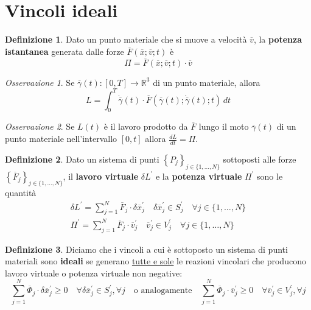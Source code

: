 \documentclass{book}
\theoremstyle{plain}
\theoremstyle{plain}
\theoremstyle{plain}
\theoremstyle{plain}
\theoremstyle{plain}
\theoremstyle{definition}
\newtheorem{defi}{Definizione}[chapter]
\theoremstyle{remark}
\newtheorem*{oss}{Osservazione}
\theoremstyle{definition}
\begin{document}
\section{Vincoli ideali}

\begin{defi}
    Dato un punto materiale che si muove a  velocità $\overline{v}$, la \textbf{potenza istantanea} generata dalle forze $\overline{F}\left(\overline{x}; \overline{v}; t\right)$ è
    \begin{displaymath}
    \boxed{
        \Pi=\overline{F}\left(\overline{x}; \overline{v}; t\right) \cdot \overline{v}
        }
    \end{displaymath}
\end{defi}

\begin{oss}
    Se $\overline{\gamma}(t): [0, T] \to \mathbb{R}^{3}$ di un punto materiale, allora
    \begin{displaymath}
        L=\int_0^{T} \dot{\overline{\gamma}}(t) \cdot \overline{F}\left(\overline{\gamma}(t); \dot{\overline{\gamma}}(t); t\right)\,dt
    \end{displaymath}
\end{oss}

\begin{oss}
    Se $L(t)$ è il lavoro prodotto da $\overline{F}$ lungo il moto $\overline{\gamma}(t)$ di un punto materiale nell'intervallo $[0, t]$ allora $\frac{dL}{dt}= \Pi$.
\end{oss}

\begin{defi}
    Dato un sistema di punti $\left\{P_{j}\right\}_{j \in \{ 1, \ldots, N\}}$ sottoposti alle forze $\left\{\overline{F}_{j}\right\}_{j \in \{1, \ldots, N\}}$, il \textbf{lavoro virtuale} $\delta L^{\prime}$ e la \textbf{potenza virtuale} $\Pi^{\prime}$ sono le quantità
    \begin{gather*}
        \delta L^{\prime}=\sum_{j=1}^{N} \overline{F}_{j} \cdot \delta \overline{x}_{j}^{\prime} \quad \delta \overline{x}_{j}^{\prime} \in S_{j}^{\prime} \quad \forall j \in\{1, \ldots, N\} \\
        \Pi^{\prime}=\sum_{j=1}^{N} \overline{F}_{j} \cdot \overline{v}_{j}^{\prime} \quad \overline{v}_{j}^{\prime} \in V_{j}^{\prime} \quad \forall j \in\{1, \ldots, N\}
    \end{gather*}
\end{defi}

\begin{defi}
    Diciamo che i vincoli a cui è sottoposto un sistema di punti materiali sono \textbf{ideali} se generano \underline{tutte e sole} le reazioni vincolari che producono lavoro virtuale o potenza virtuale non negative:
    \begin{displaymath}
        \sum_{j=1}^{N} \overline{\Phi}_{j} \cdot \delta \overline{x}_{j}^{\prime} \geq 0 \quad \forall \delta \overline{x}_{j}^{\prime} \in S_{j}^{\prime}, \forall j \quad \text{o analogamente} \quad \sum_{j=1}^{N} \overline{\Phi}_{j} \cdot \overline{v}_{j}^{\prime} \geq 0 \quad \forall \overline{v}_{j}^{\prime} \in V_{j}^{\prime}, \forall j
    \end{displaymath}
\end{defi}
\end{document}
